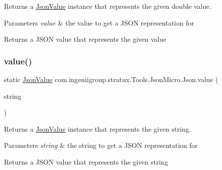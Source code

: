 Returns a \hyperlink{classcom_1_1ingeniigroup_1_1stratux_1_1_tools_1_1_json_micro_1_1_json_value}{Json\+Value} instance that represents the given {\ttfamily double} value.


\begin{DoxyParams}{Parameters}
{\em value} & the value to get a J\+S\+ON representation for \\
\hline
\end{DoxyParams}
\begin{DoxyReturn}{Returns}
a J\+S\+ON value that represents the given value 
\end{DoxyReturn}
\mbox{\label{classcom_1_1ingeniigroup_1_1stratux_1_1_tools_1_1_json_micro_1_1_json_a2ee871c2b766953b3c7db577e352fe93}} 
\subsubsection{\texorpdfstring{value()}{value()}\hspace{0.1cm}{\footnotesize\ttfamily [5/6]}}
{\footnotesize\ttfamily static \hyperlink{classcom_1_1ingeniigroup_1_1stratux_1_1_tools_1_1_json_micro_1_1_json_value}{Json\+Value} com.\+ingeniigroup.\+stratux.\+Tools.\+Json\+Micro.\+Json.\+value (\begin{DoxyParamCaption}\item[{String}]{string }\end{DoxyParamCaption})\hspace{0.3cm}{\ttfamily [static]}}

Returns a \hyperlink{classcom_1_1ingeniigroup_1_1stratux_1_1_tools_1_1_json_micro_1_1_json_value}{Json\+Value} instance that represents the given string.


\begin{DoxyParams}{Parameters}
{\em string} & the string to get a J\+S\+ON representation for \\
\hline
\end{DoxyParams}
\begin{DoxyReturn}{Returns}
a J\+S\+ON value that represents the given string 
\end{DoxyReturn}
\mbox{\label{classcom_1_1ingeniigroup_1_1stratux_1_1_tools_1_1_json_micro_1_1_json_a5733b6d96202d8f2e25b8c1dc43522b2}} 
